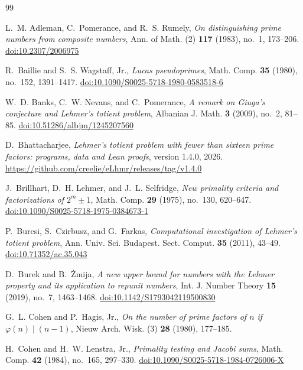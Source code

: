 \documentclass[11pt,reqno]{amsart}
\numberwithin{equation}{section}
\theoremstyle{plain}
\theoremstyle{definition}
\theoremstyle{remark}
\begin{document}
\begin{thebibliography}{99}

L.~M. Adleman, C.~Pomerance, and R.~S. Rumely,
\emph{On distinguishing prime numbers from composite numbers},
Ann. of Math. (2) \textbf{117} (1983), no.~1, 173--206.
\href{https://doi.org/10.2307/2006975}{doi:10.2307/2006975}

R.~Baillie and S.~S. Wagstaff, Jr.,
\emph{Lucas pseudoprimes},
Math. Comp. \textbf{35} (1980), no.~152, 1391--1417.
\href{https://doi.org/10.1090/S0025-5718-1980-0583518-6}{doi:10.1090/S0025-5718-1980-0583518-6}

W.~D. Banks, C.~W. Nevans, and C.~Pomerance,
\emph{A remark on Giuga's conjecture and Lehmer's totient problem},
Albanian J. Math. \textbf{3} (2009), no.~2, 81--85.
\href{https://doi.org/10.51286/albjm/1245207560}{doi:10.51286/albjm/1245207560}

D.~Bhattacharjee,
\emph{Lehmer's totient problem with fewer than sixteen prime factors:
programs, data and Lean proofs}, version 1.4.0, 2026.
\url{https://github.com/creelie/eLhmr/releases/tag/v1.4.0}

J.~Brillhart, D.~H. Lehmer, and J.~L. Selfridge,
\emph{New primality criteria and factorizations of $2^m\pm1$},
Math. Comp. \textbf{29} (1975), no.~130, 620--647.
\href{https://doi.org/10.1090/S0025-5718-1975-0384673-1}{doi:10.1090/S0025-5718-1975-0384673-1}

P.~Burcsi, S.~Czirbusz, and G.~Farkas,
\emph{Computational investigation of Lehmer's totient problem},
Ann. Univ. Sci. Budapest. Sect. Comput. \textbf{35} (2011), 43--49.
\href{https://doi.org/10.71352/ac.35.043}{doi:10.71352/ac.35.043}

D.~Burek and B.~\.Zmija,
\emph{A new upper bound for numbers with the Lehmer property and its
application to repunit numbers},
Int. J. Number Theory \textbf{15} (2019), no.~7, 1463--1468.
\href{https://doi.org/10.1142/S1793042119500830}{doi:10.1142/S1793042119500830}

G.~L. Cohen and P.~Hagis, Jr.,
\emph{On the number of prime factors of $n$ if $\varphi(n)\mid(n-1)$},
Nieuw Arch. Wisk. (3) \textbf{28} (1980), 177--185.

H.~Cohen and H.~W. Lenstra, Jr.,
\emph{Primality testing and Jacobi sums},
Math. Comp. \textbf{42} (1984), no.~165, 297--330.
\href{https://doi.org/10.1090/S0025-5718-1984-0726006-X}{doi:10.1090/S0025-5718-1984-0726006-X}


\end{thebibliography}
\end{document}
